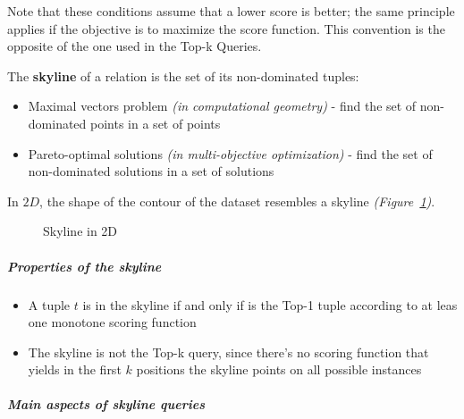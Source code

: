 \documentclass[english]{article}
\begin{document}
Note that these conditions assume that a lower score is better;
the same principle applies if the objective is to maximize the score function.
This convention is the opposite of the one used in the Top-k Queries.

The \textbf{skyline} of a relation is the set of its non-dominated tuples:

\begin{itemize}
  \item Maximal vectors problem \textit{(in computational geometry)} - find the set of non-dominated points in a set of points
  \item Pareto-optimal solutions \textit{(in multi-objective optimization)} - find the set of non-dominated solutions in a set of solutions
\end{itemize}

In \(2D\), the shape of the contour of the dataset resembles a skyline \textit{(Figure~\ref{fig:skyline-2d})}.

\begin{figure}[htbp]
  \centering
  \bigskip
  \caption{Skyline in 2D}
  \label{fig:skyline-2d}
  \bigskip
\end{figure}

\subparagraph*{Properties of the skyline}

\begin{itemize}
  \item A tuple \(t\) is in the skyline if and only if is the Top-1 tuple according to at leas one monotone scoring function
  \item The skyline is not the Top-k query, since there's no scoring function that yields in the first \(k\) positions the skyline points on all possible instances
\end{itemize}

\subparagraph*{Main aspects of skyline queries}
\end{document}

